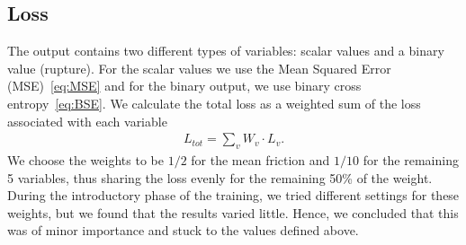 \subsection{Loss}\label{sec:loss}
The output contains two different types of variables: scalar values and a binary value (rupture). For the scalar values we use the Mean Squared Error (\acrshort{MSE})~\cref{eq:MSE} and for the binary output, we use binary cross entropy~\cref{eq:BSE}. We calculate the total loss as a weighted sum of the loss associated with
each variable
\begin{align*}
  L_{tot} = \sum_{v} W_v\cdot L_v.
\end{align*}
We choose the weights to be $1/2$ for the mean friction and $1/10$ for the
remaining 5 variables, thus sharing the loss evenly for the remaining 50\% of the weight. During the introductory phase of the training, we tried different settings for these weights, but we found that the results varied little. Hence, we concluded that this was of minor importance and stuck to the values defined above.

